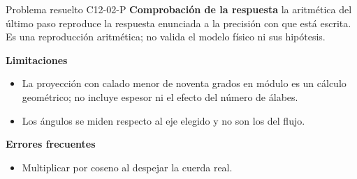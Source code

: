 \documentclass[10pt,openany]{book}
\begin{document}
\begin{studiumworked}{Problema resuelto C12-02-P}
\noindent\textbf{Comprobación de la respuesta} la aritmética del último paso reproduce la respuesta enunciada a la precisión con que está escrita. Es una reproducción aritmética; no valida el modelo físico ni sus hipótesis.

\noindent\textbf{Limitaciones}
\begin{itemize}
\item La proyección con calado menor de noventa grados en módulo es un cálculo geométrico; no incluye espesor ni el efecto del número de álabes.
\item Los ángulos se miden respecto al eje elegido y no son los del flujo.
\end{itemize}

\noindent\textbf{Errores frecuentes}
\begin{itemize}
\item Multiplicar por coseno al despejar la cuerda real.
\end{itemize}
\end{studiumworked}
\end{document}
